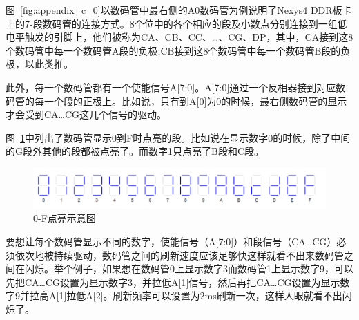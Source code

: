 图~\ref{fig:appendix_c_0}以数码管中最右侧的A0数码管为例说明了Nexys4 DDR板卡上的7-段数码管的连接方式。8个位中的各个相应的段及小数点分别连接到一组低电平触发的引脚上，他们被称为CA、CB、CC、…、CG、DP，其中，CA接到这8个数码管中每一个数码管A段的负极,CB接到这8个数码管中每一个数码管B段的负极，以此类推。

此外，每一个数码管都有一个使能信号A[7:0]。A[7:0]通过一个反相器接到对应数码管的每一个段的正极上。比如说，只有到A[0]为0的时候，最右侧数码管的显示才会受到CA…CG这几个信号的驱动。

图~\ref{fig:appendix_c_1}中列出了数码管显示0到F时点亮的段。比如说在显示数字0的时候，除了中间的G段外其他的段都被点亮了。而数字1只点亮了B段和C段。

\begin{figure}[htbp]
    \centering
    \includegraphics[width = \textwidth]{image/appendix/appendix_c_1.png}
    \caption{0-F点亮示意图}
    \label{fig:appendix_c_1}
\end{figure}

要想让每个数码管显示不同的数字，使能信号（A[7:0]）和段信号（CA…CG）必须依次地被持续驱动，数码管之间的刷新速度应该足够快这样就看不出来数码管之间在闪烁。举个例子，如果想在数码管0上显示数字3而数码管1上显示数字9，可以先把CA…CG设置为显示数字3，并拉低A[1]信号，然后再把CA…CG设置为显示数字9并拉高A[1]拉低A[2]。刷新频率可以设置为2ms刷新一次，这样人眼就看不出闪烁了。